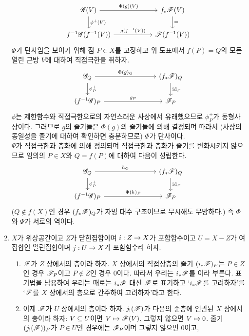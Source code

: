 \begin{enumerate}[label=\tb{1.\arabic*.},itemindent=0mm,itemsep=4mm]
	$$\begin{tikzcd}[column sep=2cm]\ms G(V)\arrow[r,"\Phi(g)(V)"]\arrow[d,"\phi^+(V)"]&f_*\ms F(V)\arrow[d,"="]\\
	f^{-1}\ms G(f^{-1}(V))\arrow[r,"g(f^{-1}(V))"]&\ms F(f^{-1}(V))\end{tikzcd}$$
	$\Phi$가 단사임을 보이기 위해 점 $P\in X$를 고정하고 위 도표에서 $f(P)=Q$의 모든 열린 근방 $V$에 대하여 직접극한을 취하자.
	$$\begin{tikzcd}[column sep=2.7cm]\ms G_Q\arrow[r,"\Phi(g)_Q"]\arrow[d,"\phi^+_P"]&(f_*\ms F)_Q\arrow[d,"\id_P"]\\
	(f^{-1}\ms G)_P\arrow[r,"g_P"]&\ms F_P\end{tikzcd}$$
	$\phi$는 제한함수와 직접극한으로의 자연스러운 사상에서 유래했으므로 $\phi^+_P$가 동형사상이다.
	그러므로 $g$의 줄기들은 $\Phi(g)$의 줄기들에 의해 결정되며
	따라서 (사상의 동일성을 줄기에 대하여 확인하면 충분하므로) $\Phi$가 단사이다.\\
	$\Psi$가 직접극한과 층화에 의해 정의되며 직접극한과 층화가 줄기를 변화시키지 않으므로
	임의의 $P\in X$와 $Q=f(P)$에 대하여 다음이 성립한다.
	$$\begin{tikzcd}[column sep=2.7cm]\ms G_Q\arrow[r,"h_Q"]\arrow[d,"\phi^+_P"]&(f_*\ms F)_Q\arrow[d,"\id_P"]\\
	(f^{-1}\ms G)_P\arrow[r,"\Psi(h)_P"]&\ms F_P\end{tikzcd}$$
	($Q\notin f(X)$인 경우 $(f_*\mathscr{F})_Q$가 자명 대수 구조이므로 무시해도 무방하다.) 즉 $\Phi$와 $\Psi$가 서로의 역이다.
	\item {} $X$가 위상공간이고 $Z$가 닫힌집합이며 $i:Z\rightarrow X$가 포함함수이고
	$U=X-Z$가 여집합인 열린집합이며 $j:U\rightarrow X$가 포함함수라 하자.
	\begin{enumerate}[label=(\alph*)]
	\item $\mathscr{F}$가 $Z$ 상에서의 층이라 하자. $X$ 상에서의 직접상층의 줄기 $(i_*\mathscr{F})_P$는
	$P\in Z$인 경우 $\mathscr{F}_P$이고 $P\notin Z$인 경우 0이다.
	따라서 우리는 $i_*\mathscr{F}$를 이라 부른다.
	표기법을 남용하여 우리는 때로는 $i_*\mathscr{F}$ 대신 $\mathscr{F}$로 표기하고 `$i_*\mathscr{F}$를 고려하자'를 
	`$\mathscr{F}$를 $X$ 상에서의 층으로 간주하여 고려하자'라고 한다.
	\item 이제 $\mathscr{F}$가 $U$ 상에서의 층이라 하자. $j_!(\mathscr{F})$가 다음의 준층에 연관된 $X$ 상에서의 층이라 하자:
	$V\subseteq U$이면 $V\mapsto\mathscr{F}(V)$, 그렇지 않으면 $V\mapsto 0$.
	줄기 $(j_!(\mathscr{F}))_P$가 $P\in U$인 경우에는 $\mathscr{F}_P$이며 그렇지 않으면 0이고,

\end{enumerate}
\end{enumerate}

